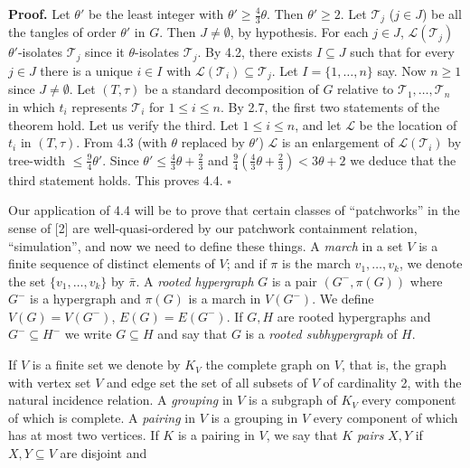 \textbf{Proof.} Let $\theta'$ be the least integer with $\theta' \ge \frac{4}{3}\theta$. Then $\theta' \ge 2$. Let $\mathscr{T}_j$ ($j \in J$) be all the tangles of order $\theta'$ in $G$. Then $J \ne \emptyset$, by hypothesis. For each $j \in J$, $\mathscr{L}(\mathscr{T}_j)$ $\theta'$-isolates $\mathscr{T}_j$ since it $\theta$-isolates $\mathscr{T}_j$. By 4.2, there exists $I \subseteq J$ such that for every $j \in J$ there is a unique $i \in I$ with $\mathscr{L}(\mathscr{T}_i) \subseteq \mathscr{T}_j$. Let $I = \{1, \dots, n\}$ say. Now $n \ge 1$ since $J \ne \emptyset$. Let $(T, \tau)$ be a standard decomposition of $G$ relative to $\mathscr{T}_1, \dots, \mathscr{T}_n$ in which $t_i$ represents $\mathscr{T}_i$ for $1 \le i \le n$. By 2.7, the first two statements of the theorem hold. Let us verify the third. Let $1 \le i \le n$, and let $\mathscr{L}$ be the location of $t_i$ in $(T, \tau)$. From 4.3 (with $\theta$ replaced by $\theta'$) $\mathscr{L}$ is an enlargement of $\mathscr{L}(\mathscr{T}_i)$ by tree-width $\le \frac{9}{4}\theta'$. Since $\theta' \le \frac{4}{3}\theta + \frac{2}{3}$ and $\frac{9}{4}(\frac{4}{3}\theta + \frac{2}{3}) < 3\theta + 2$ we deduce that the third statement holds. This proves 4.4. $\square$


Our application of 4.4 will be to prove that certain classes of ``patchworks'' in the sense of [2] are well-quasi-ordered by our patchwork containment relation, ``simulation'', and now we need to define these things. A \textit{march} in a set $V$ is a finite sequence of distinct elements of $V$; and if $\pi$ is the march $v_1, \dots, v_k$, we denote the set $\{v_1, \dots, v_k\}$ by $\bar{\pi}$. A \textit{rooted hypergraph} $G$ is a pair $(G^-, \pi(G))$ where $G^-$ is a hypergraph and $\pi(G)$ is a march in $V(G^-)$. We define $V(G) = V(G^-)$, $E(G) = E(G^-)$. If $G, H$ are rooted hypergraphs and $G^- \subseteq H^-$ we write $G \subseteq H$ and say that $G$ is a \textit{rooted subhypergraph} of $H$.

If $V$ is a finite set we denote by $K_V$ the complete graph on $V$, that is, the graph with vertex set $V$ and edge set the set of all subsets of $V$ of cardinality 2, with the natural incidence relation. A \textit{grouping} in $V$ is a subgraph of $K_V$ every component of which is complete. A \textit{pairing} in $V$ is a grouping in $V$ every component of which has at most two vertices. If $K$ is a pairing in $V$, we say that $K$ \textit{pairs} $X, Y$ if $X, Y \subseteq V$ are disjoint and

